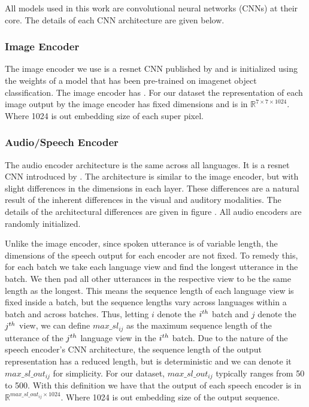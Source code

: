 All models used in this work are convolutional neural networks (CNNs) at their core.
The details of each CNN architecture are given below.

\subsubsection{Image Encoder}
The image encoder we use is a resnet CNN published by \citeme[He et al] and is initialized using the weights of a model that has been pre-trained on imagenet \citeme{} object classification.
The image encoder has .
For our dataset the representation of each image output by the image encoder has fixed dimensions and is in $\mathbb{R}^{7\times7\times1024}$.
Where 1024 is out embedding size of each super pixel.


\subsubsection{Audio/Speech Encoder}
\label{section:speech_encoder}
The audio encoder architecture is the same across all languages.
It is a resnet CNN introduced by .
The architecture is similar to the image encoder, but with slight differences in the dimensions in each layer.
These differences are a natural result of the inherent differences in the visual and auditory modalities.
The details of the architectural differences are given in figure .
All audio encoders are randomly initialized.

Unlike the image encoder, since spoken utterance is of variable length, the dimensions of the speech output for each encoder are not fixed.
To remedy this, for each batch we take each language view and find the longest utterance in the batch.
We then pad all other utterances in the respective view to be the same length as the longest.
This means the sequence length of each language view is fixed inside a batch, but the sequence lengths vary across languages within a batch and across batches.
Thus, letting $i$ denote the $i^{th}$ batch and $j$ denote the $j^{th}$ view, we can define $max\_sl_{ij}$ as the maximum sequence length of the utterance of the $j^{th}$ language view in the $i^{th}$ batch.
Due to the nature of the speech encoder's CNN architecture, the sequence length of the output representation has a reduced length, but is deterministic and we can denote it $max\_sl\_out_{ij}$ for simplicity.
For our dataset, $max\_sl\_out_{ij}$ typically ranges from 50 to 500.
With this definition we have that the output of each speech encoder is in $\mathbb{R}^{max\_sl\_out_{ij}\times 1024}$.
Where 1024 is out embedding size of the output sequence.

